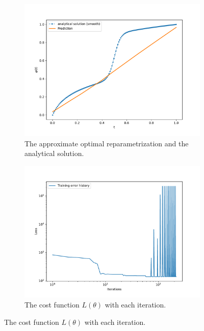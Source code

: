 \begin{figure}[t]\label{fig:curve_1_pc_pl_example}
    \begin{subfigure}[t]{0.5\textwidth}
        \centering
        \includegraphics[width=\linewidth]{figures/curve_1_pc/eks_2/plot_0_0.pdf}
        \caption{The approximate optimal reparametrization and the analytical solution.}
        \label{fig:curve_1_pc_solution}
    \end{subfigure}
    \begin{subfigure}[t]{0.5\textwidth}
        \centering
        \includegraphics[width=\linewidth]{figures/curve_1_pc/eks_2/history_plot_0.pdf}
        \caption{The cost function \(L(\theta)\) with each iteration.}
        \label{fig:curve_1_pc_history}

\end{subfigure}
\end{figure}
